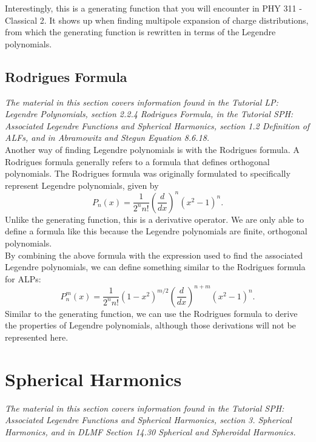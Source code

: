\documentclass[11pt]{report}
\newcommand{\fpar}[1]{\left({#1}\right)}
\begin{document}
Interestingly, this is a generating function that you will encounter in PHY 311 - Classical 2. It shows up when finding multipole expansion of charge distributions, from which the generating function is rewritten in terms of the Legendre polynomials. 
\subsection{Rodrigues Formula}

\emph{The material in this section covers information found in the Tutorial LP: Legendre Polynomials, section 2.2.4 Rodrigues Formula, in the Tutorial SPH: Associated Legendre Functions and Spherical Harmonics, section 1.2 Definition of ALFs, and in Abramowitz and Stegun Equation 8.6.18.}\\

Another way of finding Legendre polynomials is with the Rodrigues formula. A Rodrigues formula generally refers to a formula that defines orthogonal polynomials. The Rodrigues formula was originally formulated to specifically represent Legendre polynomials, given by
    \begin{equation}
        P_n\fpar{x} = \frac{1}{2^nn!}\fpar{\frac{d}{dx}}^n\fpar{x^2-1}^n.
    \end{equation}
Unlike the generating function, this is a derivative operator. We are only able to define a formula like this because the Legendre polynomials are finite, orthogonal polynomials.\\

By combining the above formula with the expression used to find the associated Legendre polynomials, we can define something similar to the Rodrigues formula for ALPs:
    \begin{equation}
        P_n^m\fpar{x} = \frac{1}{2^nn!}\fpar{1-x^2}^{m/2}\fpar{\frac{d}{dx}}^{n+m}\fpar{x^2-1}^n.
    \end{equation}
Similar to the generating function, we can use the Rodrigues formula to derive the properties of Legendre polynomials, although those derivations will not be represented here.
    


\section{Spherical Harmonics}

\emph{The material in this section covers information found in the Tutorial SPH: Associated Legendre Functions and Spherical Harmonics, section 3. Spherical Harmonics, and in DLMF Section 14.30 Spherical and Spheroidal Harmonics.}\\
\end{document}

